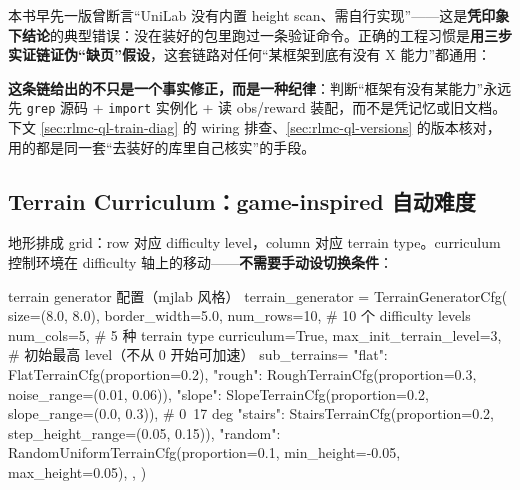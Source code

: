 \begin{insight}\label{ins:rlmc-ql-grepchain}
本书早先一版曾断言“UniLab 没有内置 height scan、需自行实现”——这是\textbf{凭印象下结论}的典型错误：没在装好的包里跑过一条验证命令。正确的工程习惯是\textbf{用三步实证链证伪“缺页”假设}，这套链路对任何“某框架到底有没有 X 能力”都通用：


\textbf{这条链给出的不只是一个事实修正，而是一种纪律}：判断“框架有没有某能力”永远先 \verb|grep| 源码 + \verb|import| 实例化 + 读 obs/reward 装配，而不是凭记忆或旧文档。下文 \cref{sec:rlmc-ql-train-diag} 的 wiring 排查、\cref{sec:rlmc-ql-versions} 的版本核对，用的都是同一套“去装好的库里自己核实”的手段。
\end{insight}

\subsection{Terrain Curriculum：game-inspired 自动难度}
\label{sec:rlmc-ql-terrain-curriculum}

地形排成 grid：row 对应 difficulty level，column 对应 terrain type。curriculum 控制环境在 difficulty 轴上的移动——\textbf{不需要手动设切换条件}：

\begin{codebox}[Python]{terrain generator 配置（mjlab 风格）}
terrain_generator = TerrainGeneratorCfg(
    size=(8.0, 8.0), border_width=5.0,
    num_rows=10,                     # 10 个 difficulty levels
    num_cols=5,                      # 5 种 terrain type
    curriculum=True,
    max_init_terrain_level=3,        # 初始最高 level（不从 0 开始可加速）
    sub_terrains={
        "flat":   FlatTerrainCfg(proportion=0.2),
        "rough":  RoughTerrainCfg(proportion=0.3, noise_range=(0.01, 0.06)),
        "slope":  SlopeTerrainCfg(proportion=0.2, slope_range=(0.0, 0.3)),    # 0~17 deg
        "stairs": StairsTerrainCfg(proportion=0.2, step_height_range=(0.05, 0.15)),
        "random": RandomUniformTerrainCfg(proportion=0.1, min_height=-0.05, max_height=0.05),
    },
)
\end{codebox}

